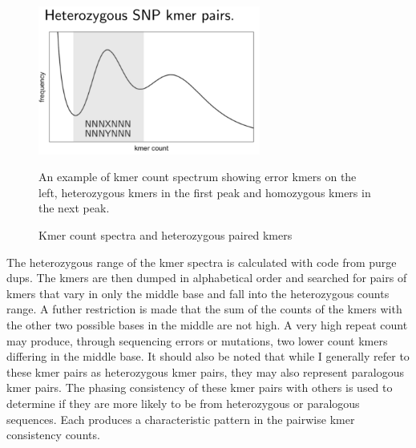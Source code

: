 \begin{figure}[htbp!]

\caption{Kmer count spectra and heterozygous paired kmers}
\label{figure:kmc}
\begin{centering}
\includegraphics[width=0.65\textwidth]{kmc.png}
\par{An example of kmer count spectrum showing error kmers on the left, heterozygous kmers in the first peak and homozygous kmers in the next peak.}
\end{centering}
\end{figure}

\par{
The heterozygous range of the kmer spectra is calculated with code from purge dups\cite{purgedups}. The kmers are then dumped in alphabetical order and searched for pairs of kmers that vary in only the middle base and fall into the heterozygous counts range. A futher restriction is made that the sum of the counts of the kmers with the other two possible bases in the middle are not high. A very high repeat count may produce, through sequencing errors or mutations, two lower count kmers differing in the middle base. It should also be noted that while I generally refer to these kmer pairs as heterozygous kmer pairs, they may also represent paralogous kmer pairs. The phasing consistency of these kmer pairs with others is used to determine if they are more likely to be from heterozygous or paralogous sequences. Each produces a characteristic pattern in the pairwise kmer consistency counts.
}


